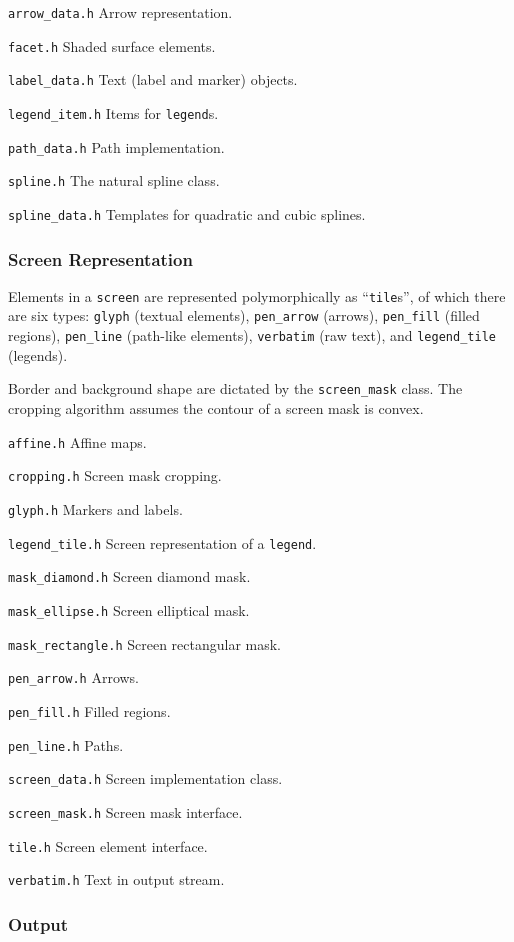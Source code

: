 \documentclass[12pt,letterpaper]{book}
\newcommand{\code}[1]{\texttt{#1}}
\newcommand{\Header}[1]{\smallskip\noindent\texttt{#1}\quad}%
\begin{document}
\Header{arrow\_data.h} Arrow representation.

\Header{facet.h} Shaded surface elements.

\Header{label\_data.h} Text (label and marker) objects.

\Header{legend\_item.h} Items for \code{legend}s.

\Header{path\_data.h} Path implementation.

\Header{spline.h} The natural spline class.

\Header{spline\_data.h} Templates for quadratic and cubic splines.


\subsubsection*{Screen Representation}

Elements in a \code{screen} are represented polymorphically as
``\code{tile}s'', of which there are six types: \code{glyph} (textual
elements), \code{pen\_arrow} (arrows), \code{pen\_fill} (filled
regions), \code{pen\_line} (path-like elements), \code{verbatim}
(raw text), and \code{legend\_tile} (legends).

Border and background shape are dictated by the \code{screen\_mask}
class. The cropping algorithm assumes the contour of a screen mask is
convex.

\Header{affine.h} Affine maps.

\Header{cropping.h} Screen mask cropping.

\Header{glyph.h} Markers and labels.

\Header{legend\_tile.h} Screen representation of a \code{legend}.

\Header{mask\_diamond.h} Screen diamond mask.

\Header{mask\_ellipse.h} Screen elliptical mask.

\Header{mask\_rectangle.h} Screen rectangular mask.

\Header{pen\_arrow.h} Arrows.

\Header{pen\_fill.h} Filled regions.

\Header{pen\_line.h} Paths.

\Header{screen\_data.h} Screen implementation class.

\Header{screen\_mask.h} Screen mask interface.

\Header{tile.h} Screen element interface.

\Header{verbatim.h} Text in output stream.


\subsubsection*{Output}
\end{document}
